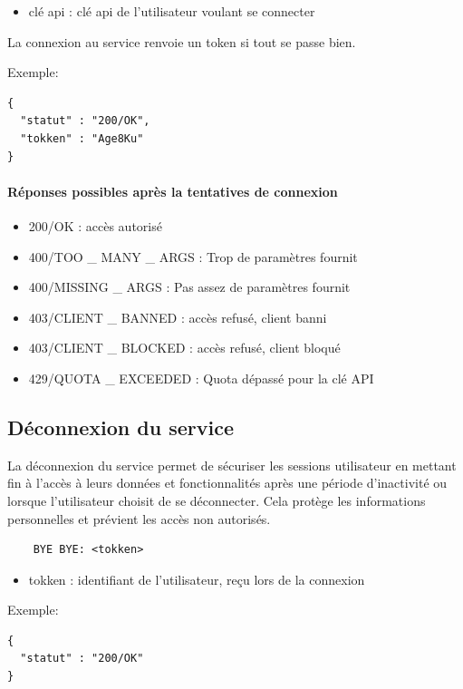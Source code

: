 \documentclass{report}
\begin{document}
\begin{itemize}
	\item clé api : clé api de l'utilisateur voulant se connecter
\end{itemize}

La connexion au service renvoie un token si tout se passe bien.

Exemple:
\begin{verbatim}
{
  "statut" : "200/OK",
  "tokken" : "Age8Ku"
}
\end{verbatim}

\paragraph{Réponses possibles après la tentatives de connexion}

\begin{itemize}
	\item 200/OK : accès autorisé
	\item 400/TOO \_ MANY \_ ARGS : Trop de paramètres fournit
	\item 400/MISSING \_ ARGS : Pas assez de paramètres fournit
	\item 403/CLIENT \_ BANNED : accès refusé, client banni
	\item 403/CLIENT \_ BLOCKED : accès refusé, client bloqué
	\item 429/QUOTA \_ EXCEEDED : Quota dépassé pour la clé API
\end{itemize}

\subsection{Déconnexion du service}

La déconnexion du service permet de sécuriser les sessions utilisateur en mettant fin à l'accès à leurs données et fonctionnalités après une période d'inactivité ou lorsque l'utilisateur choisit de se déconnecter. Cela protège les informations personnelles et prévient les accès non autorisés.

\begin{verbatim}
	BYE BYE: <tokken>
\end{verbatim}

\begin{itemize}
	\item tokken : identifiant de l'utilisateur, reçu lors de la connexion
\end{itemize}

Exemple:
\begin{verbatim}
{
  "statut" : "200/OK"
}
\end{verbatim}
\end{document}
